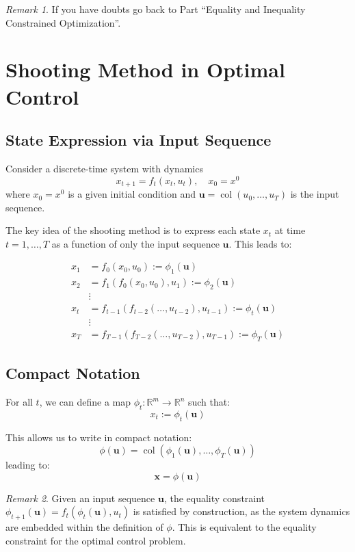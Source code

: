 \documentclass[openany]{book}
\DeclareMathOperator{\col}{col}           %
\theoremstyle{definition}
\theoremstyle{remark}
\newtheorem*{remark}{Remark}
\begin{document}
\begin{remark}
If you have doubts go back to Part ``Equality and Inequality Constrained Optimization''.
\end{remark}


\section{Shooting Method in Optimal Control}

\subsection{State Expression via Input Sequence}
Consider a discrete-time system with dynamics
\[
    x_{t+1} = f_t(x_t, u_t), \quad x_0 = x^0
\]
where $x_0 = x^0$ is a given initial condition and $\mathbf{u} = \col(u_0,\ldots,u_T)$ is the input sequence.

The key idea of the shooting method is to express each state $x_t$ at time $t = 1,\ldots,T$ as a function of only the input sequence $\mathbf{u}$. This leads to:

\begin{align*}
    x_1 &= f_0(x_0, u_0) := \phi_1(\mathbf{u})\\
    x_2 &= f_1(f_0(x_0, u_0), u_1) := \phi_2(\mathbf{u})\\
    &\vdots\\
    x_t &= f_{t-1}(f_{t-2}(\ldots, u_{t-2}), u_{t-1}) := \phi_t(\mathbf{u})\\
    &\vdots\\
    x_T &= f_{T-1}(f_{T-2}(\ldots, u_{T-2}), u_{T-1}) := \phi_T(\mathbf{u})
\end{align*}

\subsection{Compact Notation}
For all $t$, we can define a map $\phi_t: \mathbb{R}^m \to \mathbb{R}^n$ such that:
\[
    x_t := \phi_t(\mathbf{u})
\]

This allows us to write in compact notation:
\[
    \phi(\mathbf{u}) = \col(\phi_1(\mathbf{u}),\ldots,\phi_T(\mathbf{u}))
\]
leading to:
\[
    \mathbf{x} = \phi(\mathbf{u})
\]

\begin{remark}
Given an input sequence $\mathbf{u}$, the equality constraint $\phi_{t+1}(\mathbf{u}) = f_t(\phi_t(\mathbf{u}), u_t)$ is satisfied by construction, as the system dynamics are embedded within the definition of $\phi$. This is equivalent to the equality constraint for the optimal control problem.
\end{remark}
\end{document}
